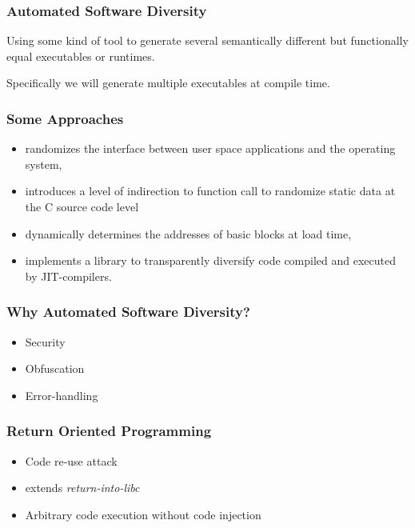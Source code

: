 \begin{frame}
	\frametitle{Automated Software Diversity}

	Using some kind of tool to generate several semantically different but functionally
	equal executables or runtimes.

	\vspace{0.5cm}

	Specifically we will generate multiple executables at compile time.

\end{frame}

\begin{frame}
	\frametitle{Some Approaches}

	\begin{itemize}
		\item \textcite{os-randomization}
randomizes the interface between user space applications and the operating system,
		\item \textcite{mem-exploits} introduces a level of indirection to function call to
			randomize static data at the C source code level
		\item \textcite{binary-stirring} dynamically determines the addresses of basic blocks
			at load time,
		\item \textcite{librando} implements a library to transparently diversify code compiled
			and executed by JIT-compilers.
	\end{itemize}

\end{frame}

\begin{frame}
	\frametitle{Why Automated Software Diversity?}

	\begin{itemize}
		\item Security
		\item Obfuscation
		\item	Error-handling
	\end{itemize}

\end{frame}


\begin{frame}
	\frametitle{Return Oriented Programming}
		\begin{itemize}
			\item Code re-use attack
			\item extends \textit{return-into-libc}
			\item Arbitrary code execution without code injection
		\end{itemize}
\end{frame}

